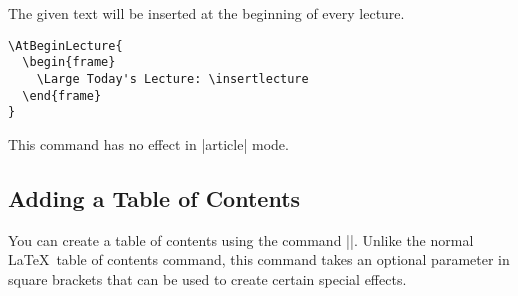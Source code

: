 
\begin{command}{\AtBeginLecture{}}
  The given text will be inserted at the beginning of every
  lecture.

  \example
\begin{verbatim}
\AtBeginLecture{
  \begin{frame}
    \Large Today's Lecture: \insertlecture
  \end{frame}
}
\end{verbatim}

  \articlenote
  This command has no effect in |article| mode.
\end{command}


\subsection{Adding a Table of Contents}

You can create a table of contents using the command |\tableofcontents|. Unlike the normal \LaTeX\ table of contents command, this command takes an optional parameter in square brackets that can be used to create certain special effects.

